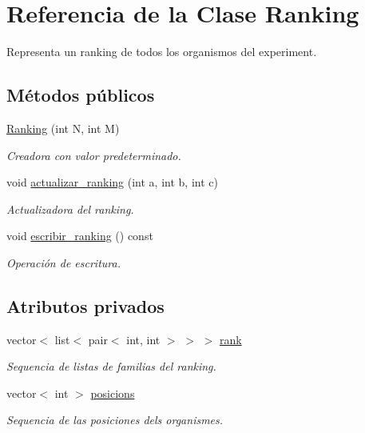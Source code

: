 \hypertarget{class_ranking}{\section{Referencia de la Clase Ranking}
\label{class_ranking}
}


Representa un ranking de todos los organismos del experiment.  


\subsection*{Métodos públicos}
\begin{DoxyCompactItemize}
\item 
\hyperlink{class_ranking_a302c72c7f20aab4368c9e3f3f3ae2a71}{Ranking} (int N, int M)
\begin{DoxyCompactList}\small\item\em Creadora con valor predeterminado. \end{DoxyCompactList}\item 
void \hyperlink{class_ranking_a2d2aec44c0e24f7a60141b49221e3dbf}{actualizar\-\_\-ranking} (int a, int b, int c)
\begin{DoxyCompactList}\small\item\em Actualizadora del ranking. \end{DoxyCompactList}\item 
void \hyperlink{class_ranking_a6a15fd8b0850310f81dd83645a307c2a}{escribir\-\_\-ranking} () const 
\begin{DoxyCompactList}\small\item\em Operación de escritura. \end{DoxyCompactList}\end{DoxyCompactItemize}
\subsection*{Atributos privados}
\begin{DoxyCompactItemize}
\item 
vector$<$ list$<$ pair$<$ int, int $>$ $>$ $>$ \hyperlink{class_ranking_a1621d0167b2811762a9cb5bc7a520e66}{rank}
\begin{DoxyCompactList}\small\item\em Sequencia de listas de familias del ranking. \end{DoxyCompactList}\item 
vector$<$ int $>$ \hyperlink{class_ranking_aaa3215582de4fcca82b9d8637584c12b}{posicions}
\begin{DoxyCompactList}\small\item\em Sequencia de las posiciones dels organismes. \end{DoxyCompactList}\end{DoxyCompactItemize}


